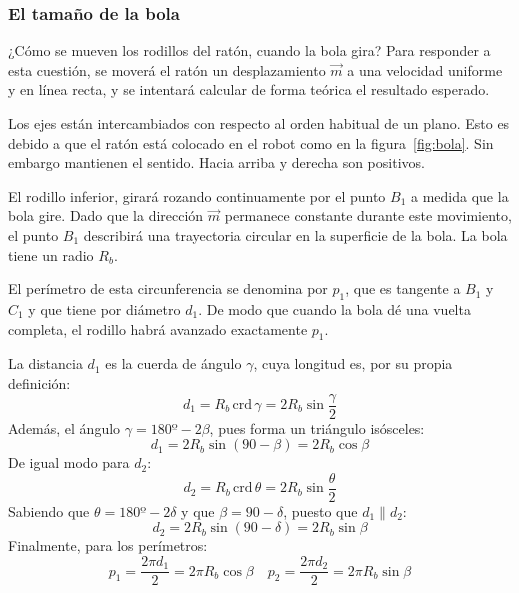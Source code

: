 \documentclass[10pt,a4paper,hidelinks,twocolumn,nobalancelastpage]{article}
\begin{document}
\begin{figure}[h]
\end{figure}
\subsubsection{El tamaño de la bola}

¿Cómo se mueven los rodillos del ratón, cuando la bola gira? Para responder a 
esta cuestión, se moverá el ratón un desplazamiento $\vec{m}$ a una velocidad 
uniforme y en línea recta, y se intentará calcular de forma teórica el resultado 
esperado.

Los ejes están intercambiados con respecto al orden habitual de un plano. Esto 
es debido a que el ratón está colocado en el robot como en la 
figura~\ref{fig:bola}. Sin embargo mantienen el sentido. Hacia arriba y derecha 
son positivos.

El rodillo inferior, girará rozando continuamente por el punto $B_1$ a medida 
que la bola gire. Dado que la dirección $\vec{m}$ permanece constante durante 
este movimiento, el punto $B_1$ describirá una trayectoria circular en la 
superficie de la bola. La bola tiene un radio $R_b$.

El perímetro de esta circunferencia se denomina por $p_1$, que es tangente a 
$B_1$ y $C_1$ y que tiene por diámetro $d_1$. De modo que cuando la bola dé una 
vuelta completa, el rodillo habrá avanzado exactamente $p_1$.

La distancia $d_1$ es la cuerda de ángulo $\gamma$, cuya longitud es, por su 
propia definición:
$$ d_1 = R_b \, \text{crd} \, \gamma = 2R_b \sin \frac{\gamma}{2}$$
Además, el ángulo $\gamma = 180º - 2\beta$, pues forma un triángulo isósceles:
$$ d_1 = 2R_b \sin(90-\beta) = 2R_b\cos \beta$$
De igual modo para $d_2$:
$$ d_2 = R_b \, \text{crd} \, \theta = 2R_b \sin \frac{\theta}{2} $$
Sabiendo que $\theta = 180º - 2\delta$ y que $\beta = 90 - \delta$, puesto que 
$d_1 \parallel d_2$:
$$ d_2 = 2R_b \sin (90 - \delta) = 2R_b \sin \beta $$
Finalmente, para los perímetros:
$$ p_1 = \frac{2\pi d_1}{2} = 2 \pi R_b\cos \beta \quad  p_2 = \frac{2\pi 
d_2}{2} = 2 \pi R_b\sin \beta $$
\end{document}
